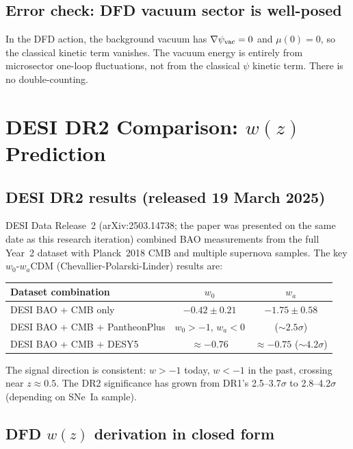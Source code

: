 \documentclass[11pt]{article}
\newcommand{\mufd}{\mu}
\begin{document}
\subsection{Error check: DFD vacuum sector is well-posed}

In the DFD action, the background vacuum has $\nabla\psi_{\rm vac} = 0$
and $\mufd(0) = 0$, so the classical kinetic term vanishes.  The vacuum
energy is entirely from microsector one-loop fluctuations, not from the
classical $\psi$ kinetic term.  There is no double-counting.

\section{DESI DR2 Comparison: $w(z)$ Prediction}
\label{sec:desi-dr2}

\subsection{DESI DR2 results (released 19 March 2025)}

DESI Data Release~2 (arXiv:2503.14738; the paper was presented on the
same date as this research iteration) combined BAO measurements from the
full Year~2 dataset with Planck~2018 CMB and multiple supernova samples.
The key $w_0$-$w_a$CDM (Chevallier-Polarski-Linder) results are:

\begin{center}
\begin{tabular}{lcc}
\toprule
Dataset combination & $w_0$ & $w_a$ \\
\midrule
DESI BAO + CMB only & $-0.42 \pm 0.21$ & $-1.75 \pm 0.58$ \\
DESI BAO + CMB + PantheonPlus & $w_0 > -1$, $w_a < 0$ & ($\sim 2.5\sigma$) \\
DESI BAO + CMB + DESY5 & $\approx -0.76$ & $\approx -0.75$ ($\sim 4.2\sigma$) \\
\bottomrule
\end{tabular}
\end{center}

The signal direction is consistent: $w > -1$ today, $w < -1$ in the
past, crossing near $z \approx 0.5$.  The DR2 significance has grown
from DR1's 2.5--3.7$\sigma$ to 2.8--4.2$\sigma$ (depending on SNe~Ia
sample).

\subsection{DFD $w(z)$ derivation in closed form}
\end{document}
